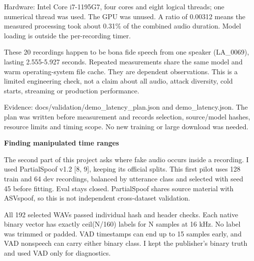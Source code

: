 \documentclass[10pt,a4paper]{article}
\newcommand{\reporttitle}[1]{{\color{navy}\Large\bfseries #1}\par\vspace{5pt}}
\begin{document}
Hardware: Intel Core i7-1195G7, four cores and eight logical threads; one numerical thread was used. The GPU was unused. A ratio of 0.00312 means the measured processing took about 0.31\% of the combined audio duration. Model loading is outside the per-recording timer.\par

\par

These 20 recordings happen to be bona fide speech from one speaker (LA\_0069), lasting 2.555-5.927 seconds. Repeated measurements share the same model and warm operating-system file cache. They are dependent observations. This is a limited engineering check, not a claim about all audio, attack diversity, cold starts, streaming or production performance.\par

{\small Evidence: docs/validation/demo\_latency\_plan.json and demo\_latency.json. The plan was written before measurement and records selection, source/model hashes, resource limits and timing scope. No new training or large download was needed.}\par

\clearpage

\reporttitle{Finding manipulated time ranges}

The second part of this project asks where fake audio occurs inside a recording. I used PartialSpoof v1.2 [8, 9], keeping its official splits. This first pilot uses 128 train and 64 dev recordings, balanced by utterance class and selected with seed 45 before fitting. Eval stays closed. PartialSpoof shares source material with ASVspoof, so this is not independent cross-dataset validation.\par

\par

All 192 selected WAVs passed individual hash and header checks. Each native binary vector has exactly ceil(N/160) labels for N samples at 16 kHz. No label was trimmed or padded. VAD timestamps can end up to 15 samples early, and VAD nonspeech can carry either binary class. I kept the publisher's binary truth and used VAD only for diagnostics.\par

\par
\end{document}
